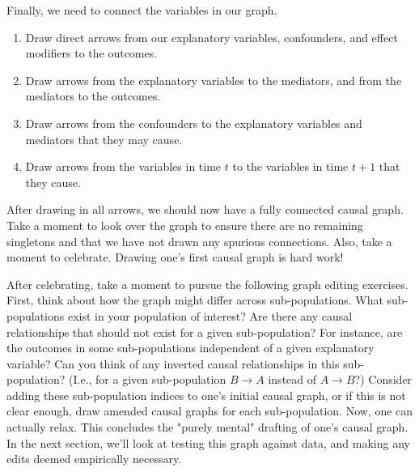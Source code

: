 Finally, we need to connect the variables in our graph.
\begin{enumerate}
   \item Draw direct arrows from our explanatory variables, confounders, and effect modifiers to the outcomes.
   \item Draw arrows from the explanatory variables to the mediators, and from the mediators to the outcomes.
   \item Draw arrows from the confounders to the explanatory variables and mediators that they may cause.
   \item Draw arrows from the variables in time $t$ to the variables in time $t+1$ that they cause.
\end{enumerate}
After drawing in all arrows, we should now have a fully connected causal graph.
Take a moment to look over the graph to ensure there are no remaining singletons and that we have not drawn any spurious connections.
Also, take a moment to celebrate.
Drawing one's first causal graph is hard work!

After celebrating, take a moment to pursue the following graph editing exercises.
First, think about how the graph might differ across sub-populations.
What sub-populations exist in your population of interest?
Are there any causal relationships that should not exist for a given sub-population?
For instance, are the outcomes in some sub-populations independent of a given explanatory variable?
Can you think of any inverted causal relationships in this sub-population?
(I.e., for a given sub-population $B \rightarrow A$ instead of $A \rightarrow B$?)
Consider adding these sub-population indices to one's initial causal graph, or if this is not clear enough, draw amended causal graphs for each sub-population.
Now, one can actually relax.
This concludes the "purely mental" drafting of one's causal graph.
In the next section, we'll look at testing this graph against data, and making any edits deemed empirically necessary.
